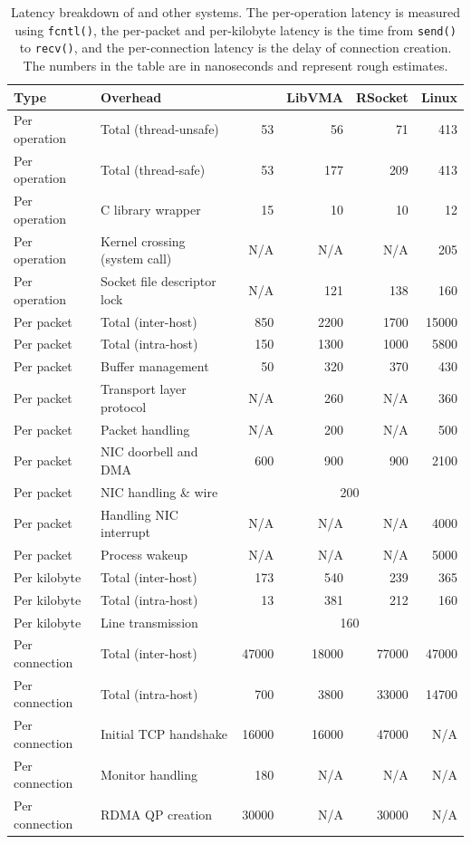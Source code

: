 \begin{table}[htbp]
	\centering
	\small
		\begin{tabular}{l|l|r|r|r|r}
			\hline
			Type & Overhead & \sys & LibVMA & RSocket & Linux \\
			\hline
			\hline
			Per operation & Total (thread-unsafe) & 53 & 56 & 71 & 413 \\
			\hline
			Per operation & Total (thread-safe) & 53 & 177 & 209 & 413 \\
			\hline
			Per operation & C library wrapper & 15 & 10 & 10 & 12 \\
			\hline
			Per operation & Kernel crossing (system call) & N/A & N/A & N/A & 205 \\
			\hline
			Per operation & Socket file descriptor lock & N/A & 121 & 138 & 160 \\
			\hline
			\hline
			Per packet & Total (inter-host) & 850 & 2200 & 1700 & 15000 \\
			\hline
			Per packet & Total (intra-host) & 150 & 1300 & 1000 & 5800 \\
			\hline
			Per packet & Buffer management & 50 & 320 & 370 & 430 \\
			\hline
			Per packet & Transport layer protocol & N/A & 260 & N/A & 360 \\
			\hline
			Per packet & Packet handling & N/A & 200 & N/A & 500 \\
			\hline
			Per packet & NIC doorbell and DMA & 600 & 900 & 900 & 2100 \\
			\hline
			Per packet & NIC handling \& wire & \multicolumn{4}{c}{200} \\
			\hline
			Per packet & Handling NIC interrupt & N/A & N/A & N/A & 4000 \\
			\hline
			Per packet & Process wakeup & N/A & N/A & N/A & 5000 \\
			\hline
			\hline
			Per kilobyte & Total (inter-host)& 173 & 540 & 239 & 365 \\
			\hline
			Per kilobyte & Total (intra-host) & 13 & 381 & 212 & 160 \\
			\hline
			Per kilobyte & Line transmission & \multicolumn{4}{c}{160} \\
			\hline
			\hline
			Per connection & Total (inter-host)& 47000 & 18000 & 77000 & 47000 \\
			\hline
			Per connection & Total (intra-host) & 700 & 3800 & 33000 & 14700 \\
			\hline
			Per connection & Initial TCP handshake & 16000 & 16000 & 47000 & N/A \\
			\hline
			Per connection & Monitor handling & 180 & N/A & N/A & N/A \\
			\hline
			Per connection & RDMA QP creation & 30000 & N/A & 30000 & N/A \\
			\hline
		\end{tabular}
	\caption{Latency breakdown of \sys{} and other systems. The per-operation latency is measured using \texttt{fcntl()}, the per-packet and per-kilobyte latency is the time from \texttt{send()} to \texttt{recv()}, and the per-connection latency is the delay of connection creation. The numbers in the table are in nanoseconds and represent rough estimates.}
	\label{tab:microbenchmark}
\end{table}



